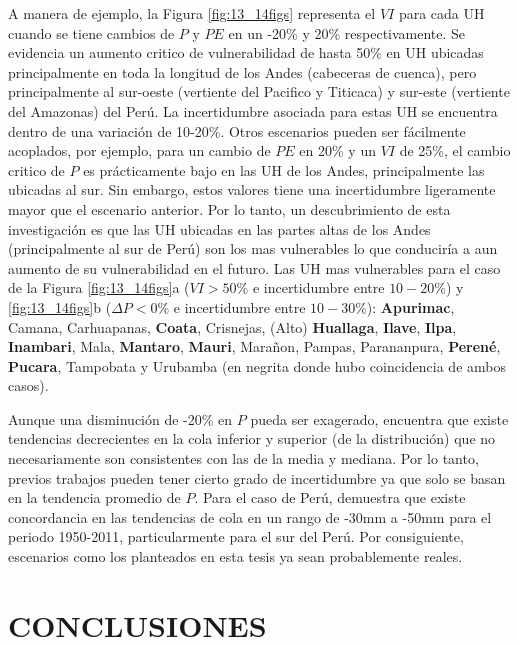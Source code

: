 \documentclass[12pt]{article}
\begin{document}
A manera de ejemplo, la Figura \ref{fig:13_14figs} representa el $VI$ para cada UH cuando se tiene cambios de $P$ y $PE$ en un -20\% y 20\% respectivamente. Se evidencia un aumento critico de vulnerabilidad de hasta 50\% en UH ubicadas principalmente en toda la longitud de los Andes (cabeceras de cuenca), pero principalmente al sur-oeste (vertiente del Pacifico y Titicaca) y sur-este (vertiente del Amazonas) del Perú. La incertidumbre asociada para estas UH se encuentra dentro de una variación de 10-20\%. Otros escenarios pueden ser fácilmente acoplados, por ejemplo, para un cambio de $PE$ en 20\% y un $VI$ de 25\%, el cambio critico de $P$ es prácticamente bajo en las UH de los Andes, principalmente las ubicadas al sur. Sin embargo, estos valores tiene una incertidumbre ligeramente mayor que el escenario anterior. Por lo tanto, un descubrimiento de esta investigación es que las UH ubicadas en las partes altas de los Andes (principalmente al sur de Perú) son los mas vulnerables lo que conduciría a aun aumento de su vulnerabilidad en el futuro. Las UH mas vulnerables para el caso de la Figura \ref{fig:13_14figs}a ($VI > 50\%$ e incertidumbre entre $10-20\%$) y \ref{fig:13_14figs}b ($\Delta P < 0\%$ e incertidumbre entre $10-30\%$): \textbf{Apurimac}, Camana, Carhuapanas, \textbf{Coata}, Crisnejas, (Alto) \textbf{Huallaga}, \textbf{Ilave}, \textbf{Ilpa}, \textbf{Inambari}, Mala, \textbf{Mantaro}, \textbf{Mauri}, Marañon, Pampas, Parananpura, \textbf{Perené}, \textbf{Pucara}, Tampobata y Urubamba (en negrita donde hubo coincidencia de ambos casos).

Aunque una disminución de -20\% en $P$ pueda ser exagerado, \citet{lausier2018overlooked} encuentra que existe tendencias decrecientes en la cola inferior y superior (de la distribución) que no necesariamente son consistentes con las de la media y mediana. Por lo tanto, previos trabajos pueden tener cierto grado de incertidumbre ya que solo se basan en la tendencia promedio de $P$. Para el caso de Perú, \citet{lausier2018overlooked} demuestra que existe concordancia en las tendencias de cola en un rango de -30mm a -50mm para el periodo 1950-2011, particularmente para el sur del Perú. Por consiguiente, escenarios como los planteados en esta tesis ya sean probablemente reales.



\clearpage
\vspace*{0.5mm}
\section{CONCLUSIONES}
\end{document}
